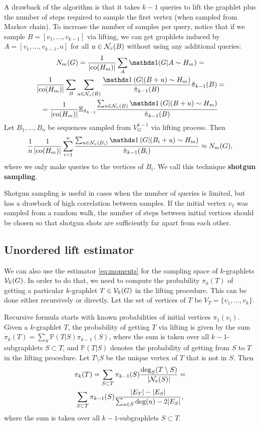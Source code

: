 	A drawback of the algorithm is that it takes $k-1$ queries to lift the graphlet plus the number of steps required to sample the first vertex (when sampled from Markov chain). 
	To increase the number of samples per query, notice that if we sample $B = [v_1, \ldots, v_{k-1}]$ via lifting, we can get graphlets induced by $A = [v_1,\ldots, v_{k-1},u]$ for all $u \in \mathcal{N}_v(B)$ without using any additional queries:
	\begin{multline*}
	    N_m(G) = \frac{1}{|\co(H_m)|}\sum_{A} \ind(G|A \sim H_m) =\\
	    \frac{1}{|\co(H_m)|}\sum_{B}\sum_{u\in \cN_v(B)} \frac{\ind\left(G|(B+u) \sim H_m\right)}{\tilde\pi_{k-1}(B)} \tilde\pi_{k-1}(B) = \\
	    =\frac{1}{|\co(H_m)|} \E_{\tilde\pi_{k-1}} \frac{\sum_{u\in \cN_v(B)} \ind\left(G|(B+u) \sim H_m\right)}{\tilde\pi_{k-1}(B)}
	\end{multline*}
	Let $B_1,\ldots,B_n$ be sequences sampled from $V^{k-1}_G$ via lifting process.
	Then
	\begin{equation*}
	    \frac{1}{n}\frac{1}{|\co(H_m)|}\sum_{i=1}^n \frac{\sum_{u\in \cN_v(B_i)} \ind\left(G|(B_i+u)\sim H_m\right)}{\tilde\pi_{k-1}(B_i)} \approx N_m(G),
	\end{equation*}
	where we only make queries to the vertices of $B_i$.
	We call this technique \textbf{shotgun sampling}.
	
	Shotgun sampling is useful in cases when the number of queries is limited, but has a drawback of high correlation between samples.
	If the initial vertex $v_1$ was sampled from a random walk, the number of steps between initial vertices should be chosen so that shotgun shots are sufficiently far apart from each other.
	
	\subsection{Unordered lift estimator}
	
	We can also use the estimator \eqref{eq:moments} for the sampling space of $k$-graphlets $\mathcal{V}_k(G)$.
	In order to do that, we need to compute the probability $\pi_k(T)$ of getting a particular $k$-graphlet $T \in \mathcal{V}_k(G)$ in the lifting procedure.
	This can be done either recursively or directly. 
	Let the set of vertices of $T$ be $V_T=\{v_1,\ldots,v_k\}$.
	
	Recursive formula starts with known probabilities of initial vertices $\pi_1(v_i)$.
	Given a $k$-graphlet $T$, the probability of getting $T$ via lifting is given by the sum $\pi_k(T) = \sum_S \mathbb{P}(T|S) \pi_{k-1}(S)$, where the sum is taken over all $k-1$-subgraphlets $S\subset T$, and $\mathbb{P}(T|S)$ denotes the probability of getting from $S$ to $T$ in the lifting procedure.
	Let $T\setminus S$ be the unique vertex of $T$ that is not in $S$.
	Then
	\begin{multline}
	\label{eq:recursive}
		\pi_{k}(T) = \sum_{S\subset T} \pi_{k-1}(S) \frac{\mathrm{deg}_S (T\setminus S)}{|\mathcal{N}_e(S)|} = \\
		\sum_{S\subset T} \pi_{k-1}(S) \frac{|E_T| - |E_S|}
		{\sum_{u\in S} \mathrm{deg}(u) - 2|E_S|},
	\end{multline}
	where the sum is taken over all $k-1$-subgraphlets $S\subset T$.
	
